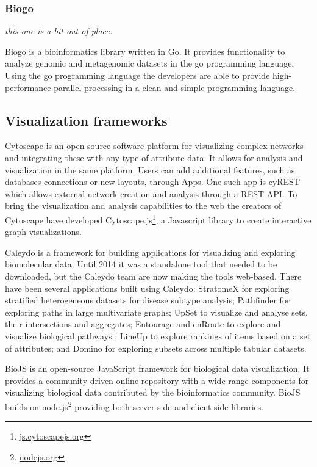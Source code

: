 \subsubsection*{Biogo} 
\emph{this one is a bit out of place.}

Biogo is a bioinformatics library written in Go. It provides functionality to
analyze genomic and metagenomic datasets in the go programming
language.\cite{Kortschak005033} Using the go programming language the developers
are able to provide high-performance parallel processing in a clean and simple
programming language. 

\subsection*{Visualization frameworks} 
Cytoscape is an open source software platform for visualizing complex
networks and integrating these with any type of attribute
data\cite{shannon2003cytoscape}. It allows for analysis and visualization in the
same platform. Users can add additional features, such as databases connections
or new layouts, through Apps. One such app is cyREST which allows external network
creation and analysis through a REST API\cite{ono2015cyrest}.
To bring the visualization and analysis
capabilities to the web the creators of Cytoscape have developed
Cytoscape.js\footnote{\url{js.cytoscapejs.org}}, a Javascript library to create
interactive graph visualizations. 


Caleydo is a framework for building applications for visualizing and exploring
biomolecular data\cite{cleydo}. Until 2014 it was a standalone tool that needed
to be downloaded, but the Caleydo team are now making the tools web-based. There
have been several applications built using Caleydo: StratomeX for exploring
stratified heterogeneous datasets for disease subtype analysis\cite{stratomex};
Pathfinder for exploring paths in large multivariate graphs\cite{pathfinder};
UpSet to visualize and analyse sets, their intersections and
aggregates\cite{upset}; Entourage and enRoute to explore and visualize
biological pathways \cite{entourage}\cite{enroute}; LineUp to explore rankings
of items based on a set of attributes\cite{lineup}; and Domino for exploring
subsets across multiple tabular datasets\cite{domino}. 

BioJS is an open-source JavaScript framework for biological data
visualization.\cite{gomez2013biojs} It provides a community-driven online
repository with a wide range components for visualizing biological data
contributed by the bioinformatics community. BioJS builds on
node.js\footnote{\url{nodejs.org}} providing both server-side and client-side
libraries. 


